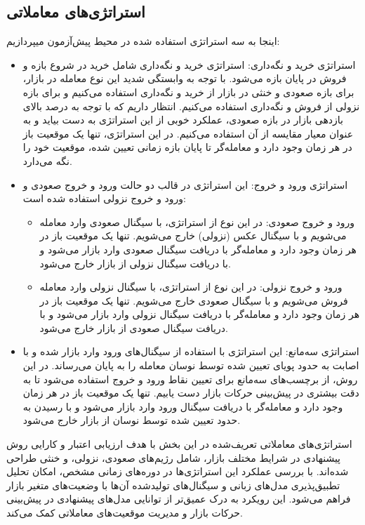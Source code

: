 \subsection{استراتژی‌های معاملاتی}
اینجا به سه استراتژی استفاده شده در محیط پیش‌آزمون میپردازیم:
\begin{itemize}
    \item استراتژی خرید و نگه‌داری:
     استراتژی خرید و نگه‌داری شامل خرید در شروع بازه و فروش در پایان بازه می‌شود. با توجه به وابستگی شدید این نوع معامله در بازار، برای بازه صعودی و خنثی در بازار از خرید و نگه‌داری استفاده می‌کنیم و برای بازه نزولی از فروش و نگه‌داری استفاده می‌کنیم. انتظار داریم که با توجه به درصد بالای بازدهی بازار در بازه صعودی، عملکرد خوبی از این استراتژی به دست بیاید و به عنوان معیار مقایسه از آن استفاده می‌کنیم. در این استراتژی، تنها یک موقعیت باز در هر زمان وجود دارد و معامله‌گر تا پایان بازه زمانی تعیین شده، موقعیت خود را نگه می‌دارد.
    
    \item استراتژی ورود و خروج:
    این استراتژی در قالب دو حالت ورود و خروج صعودی و ورود و خروج نزولی استفاده شده است:
    \begin{itemize}
        \item ورود و خروج صعودی:
        در این نوع از استراتژی، با سیگنال صعودی وارد معامله می‌شویم و با سیگنال عکس (نزولی) خارج می‌شویم. تنها یک موقعیت باز در هر زمان وجود دارد و معامله‌گر با دریافت سیگنال صعودی وارد بازار می‌شود و با دریافت سیگنال نزولی از بازار خارج می‌شود.
        
        \item ورود و خروج نزولی:
        در این نوع از استراتژی، با سیگنال نزولی وارد معامله فروش می‌شویم و با سیگنال صعودی خارج می‌شویم. تنها یک موقعیت باز در هر زمان وجود دارد و معامله‌گر با دریافت سیگنال نزولی وارد بازار می‌شود و با دریافت سیگنال صعودی از بازار خارج می‌شود.
    \end{itemize}
    
    \item استراتژی سه‌مانع:
    این استراتژی با استفاده از سیگنال‌های ورود وارد بازار شده و با اصابت به حدود پویای تعیین شده توسط نوسان معامله را به پایان می‌رساند. در این روش، از برچسب‌های سه‌مانع برای تعیین نقاط ورود و خروج استفاده می‌شود تا به دقت بیشتری در پیش‌بینی حرکات بازار دست یابیم. تنها یک موقعیت باز در هر زمان وجود دارد و معامله‌گر با دریافت سیگنال ورود وارد بازار می‌شود و با رسیدن به حدود تعیین شده توسط نوسان از بازار خارج می‌شود.
\end{itemize}

استراتژی‌های معاملاتی تعریف‌شده در این بخش با هدف ارزیابی اعتبار و کارایی روش پیشنهادی در شرایط مختلف بازار، شامل رژیم‌های صعودی، نزولی، و خنثی طراحی شده‌اند. با بررسی عملکرد این استراتژی‌ها در دوره‌های زمانی مشخص، امکان تحلیل تطبیق‌پذیری مدل‌های زبانی و سیگنال‌های تولیدشده آن‌ها با وضعیت‌های متغیر بازار فراهم می‌شود. این رویکرد به درک عمیق‌تر از توانایی مدل‌های پیشنهادی در پیش‌بینی حرکات بازار و مدیریت موقعیت‌های معاملاتی کمک می‌کند.
